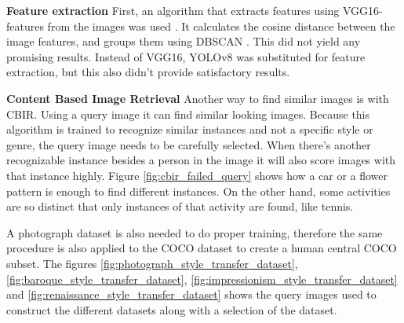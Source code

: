 \textbf{Feature extraction}
First, an algorithm that extracts features using VGG16-features from the images was used \cite{Roman2023}.
It calculates the cosine distance between the image features, and groups them using DBSCAN \cite{Ester1996}.
This did not yield any promising results.
Instead of VGG16, YOLOv8 \cite{Jocher_Ultralytics_YOLO_2023} was substituted for feature extraction, but this also didn't provide satisfactory results.

\textbf{Content Based Image Retrieval}
Another way to find similar images is with \gls{CBIR}.
Using a query image it can find similar looking images.
Because this algorithm is trained to recognize similar instances and not a specific style or genre, the query image needs to be carefully selected.
When there's another recognizable instance besides a person in the image it will also score images with that instance highly.
Figure \ref{fig:cbir_failed_query} shows how a car or a flower pattern is enough to find different instances.
On the other hand, some activities are so distinct that only instances of that activity are found, like tennis.

A photograph dataset is also needed to do proper training, therefore the same procedure is also applied to the COCO dataset to create a human central COCO subset.
The figures \ref{fig:photograph_style_transfer_dataset}, \ref{fig:baroque_style_transfer_dataset}, \ref{fig:impressionism_style_transfer_dataset} and \ref{fig:renaissance_style_transfer_dataset} shows the query images used to construct the different datasets along with a selection of the dataset.

